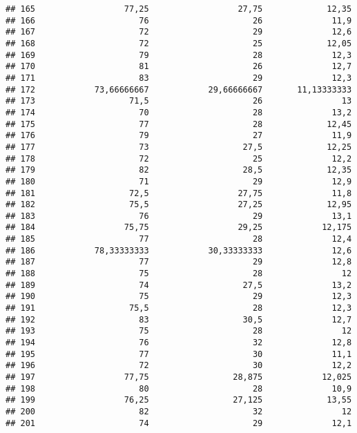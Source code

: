 \documentclass[
]{article}
\begin{document}
\begin{verbatim}
## 165                  77,25                  27,75             12,35
## 166                     76                     26              11,9
## 167                     72                     29              12,6
## 168                     72                     25             12,05
## 169                     79                     28              12,3
## 170                     81                     26              12,7
## 171                     83                     29              12,3
## 172            73,66666667            29,66666667       11,13333333
## 173                   71,5                     26                13
## 174                     70                     28              13,2
## 175                     77                     28             12,45
## 176                     79                     27              11,9
## 177                     73                   27,5             12,25
## 178                     72                     25              12,2
## 179                     82                   28,5             12,35
## 180                     71                     29              12,9
## 181                   72,5                  27,75              11,8
## 182                   75,5                  27,25             12,95
## 183                     76                     29              13,1
## 184                  75,75                  29,25            12,175
## 185                     77                     28              12,4
## 186            78,33333333            30,33333333              12,6
## 187                     77                     29              12,8
## 188                     75                     28                12
## 189                     74                   27,5              13,2
## 190                     75                     29              12,3
## 191                   75,5                     28              12,3
## 192                     83                   30,5              12,7
## 193                     75                     28                12
## 194                     76                     32              12,8
## 195                     77                     30              11,1
## 196                     72                     30              12,2
## 197                  77,75                 28,875            12,025
## 198                     80                     28              10,9
## 199                  76,25                 27,125             13,55
## 200                     82                     32                12
## 201                     74                     29              12,1

\end{verbatim}
\end{document}
